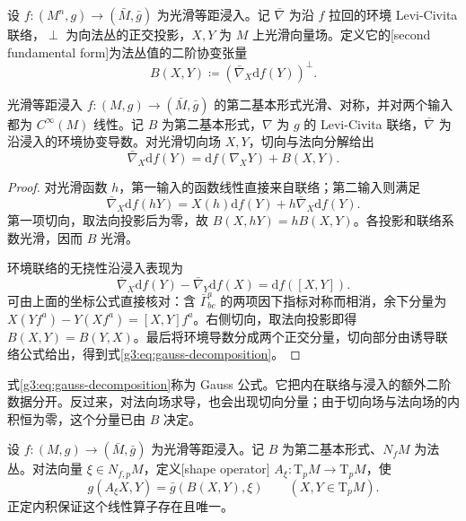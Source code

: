\begin{definition}\label{g3:def:second-fundamental-form}
	设 \(f:(M^n,g)\to(\bar M,\bar g)\) 为光滑等距浸入。记 \(\bar\nabla\) 为沿 \(f\) 拉回的环境 Levi-Civita 联络，\(\perp\) 为向法丛的正交投影，\(X,Y\) 为 \(M\) 上光滑向量场。定义它的[second fundamental form]为法丛值的二阶协变张量
	\[
		B(X,Y)\coloneqq(\bar\nabla_X\mathrm df(Y))^\perp.
	\]
\end{definition}

\begin{proposition}\label{g3:prop:gauss-decomposition}
	光滑等距浸入 \(f:(M,g)\to(\bar M,\bar g)\) 的第二基本形式光滑、对称，并对两个输入都为 \(C^\infty(M)\) 线性。记 \(B\) 为第二基本形式，\(\nabla\) 为 \(g\) 的 Levi-Civita 联络，\(\bar\nabla\) 为沿浸入的环境协变导数。对光滑切向场 \(X,Y\)，切向与法向分解给出
	\begin{equation}\label{g3:eq:gauss-decomposition}
		\bar\nabla_X\mathrm df(Y)=\mathrm df(\nabla_XY)+B(X,Y).
	\end{equation}
\end{proposition}
\begin{proof}
	对光滑函数 \(h\)，第一输入的函数线性直接来自联络；第二输入则满足
	\[
		\bar\nabla_X\mathrm df(hY)
		=X(h)\mathrm df(Y)+h\bar\nabla_X\mathrm df(Y).
	\]
	第一项切向，取法向投影后为零，故 \(B(X,hY)=hB(X,Y)\)。各投影和联络系数光滑，因而 \(B\) 光滑。

	环境联络的无挠性沿浸入表现为
	\[
		\bar\nabla_X\mathrm df(Y)-\bar\nabla_Y\mathrm df(X)
		=\mathrm df([X,Y]).
	\]
	可由上面的坐标公式直接核对：含 \(\bar\Gamma^a_{bc}\) 的两项因下指标对称而相消，余下分量为 \(X(Yf^a)-Y(Xf^a)=[X,Y]f^a\)。右侧切向，取法向投影即得 \(B(X,Y)=B(Y,X)\)。最后将环境导数分成两个正交分量，切向部分由诱导联络公式给出，得到式\eqref{g3:eq:gauss-decomposition}。
\end{proof}

式\eqref{g3:eq:gauss-decomposition}称为 Gauss 公式。它把内在联络与浸入的额外二阶数据分开。反过来，对法向场求导，也会出现切向分量；由于切向场与法向场的内积恒为零，这个分量已由 \(B\) 决定。

\begin{definition}\label{g3:def:shape-operator}
	设 \(f:(M,g)\to(\bar M,\bar g)\) 为光滑等距浸入。记 \(B\) 为第二基本形式、\(N_fM\) 为法丛。对法向量 \(\xi\in N_{f,p}M\)，定义[shape operator]
	\(A_\xi:\mathrm{T}_pM\to\mathrm{T}_pM\)，使
	\begin{equation}\label{g3:eq:shape-operator-pairing}
		g(A_\xi X,Y)=\bar g(B(X,Y),\xi)
		\qquad(X,Y\in\mathrm{T}_pM).
	\end{equation}
	正定内积保证这个线性算子存在且唯一。
\end{definition}

